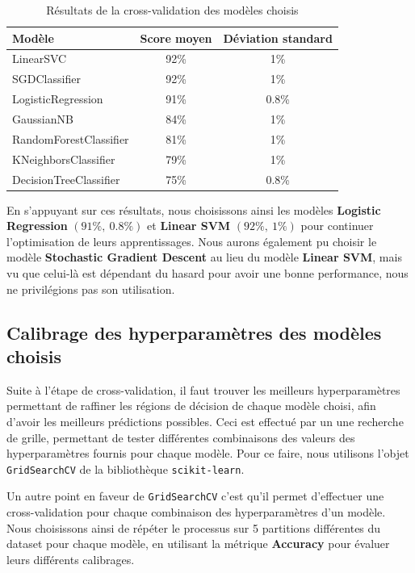 \documentclass[12pt,a4paper]{report}
\theoremstyle{definition}
\begin{document}
\begin{table}
  \centering
  \begin{tabular}{|p{5cm}|c|c|}
    \hline
    \textbf{Modèle} & \textbf{Score moyen} & \textbf{Déviation standard}\\
    \hline
    \hline
    LinearSVC & 92\% & 1\%\\
    \hline
    SGDClassifier & 92\% & 1\%\\
    \hline
    LogisticRegression & 91\% & 0.8\%\\
    \hline
    GaussianNB & 84\% & 1\%\\
    \hline
    RandomForestClassifier & 81\% & 1\%\\
    \hline
    KNeighborsClassifier & 79\% & 1\%\\
    \hline
    DecisionTreeClassifier & 75\% & 0.8\%\\
    \hline
  \end{tabular}
  \caption{Résultats de la cross-validation des modèles choisis}
  \label{table:cross_validation}
\end{table}

En s'appuyant sur ces résultats, nous choisissons ainsi les modèles \textbf{Logistic Regression} $(91\%,~ 0.8\%)$ et \textbf{Linear SVM} $(92\%,~ 1\%)$ pour continuer l'optimisation de leurs apprentissages. Nous aurons également pu choisir le modèle \textbf{Stochastic Gradient Descent} au lieu du modèle \textbf{Linear SVM}, mais vu que celui-là est dépendant du hasard pour avoir une bonne performance, nous ne privilégions pas son utilisation.

\subsection{Calibrage des hyperparamètres des modèles choisis}
Suite à l'étape de cross-validation, il faut trouver les meilleurs hyperparamètres permettant de raffiner les régions de décision de chaque modèle
choisi, afin d’avoir les meilleurs prédictions possibles. Ceci est effectué par un une recherche de grille, permettant de tester différentes combinaisons des valeurs des hyperparamètres fournis pour chaque modèle. Pour ce faire, nous utilisons l'objet \texttt{GridSearchCV} de la bibliothèque \texttt{scikit-learn}.

Un autre point en faveur de \texttt{GridSearchCV} c'est qu'il permet d'effectuer une cross-validation pour chaque combinaison des hyperparamètres d'un modèle. Nous choisissons ainsi de répéter le processus sur 5 partitions différentes du dataset pour chaque modèle, en utilisant la métrique \textbf{Accuracy} pour évaluer leurs différents calibrages.
\end{document}
